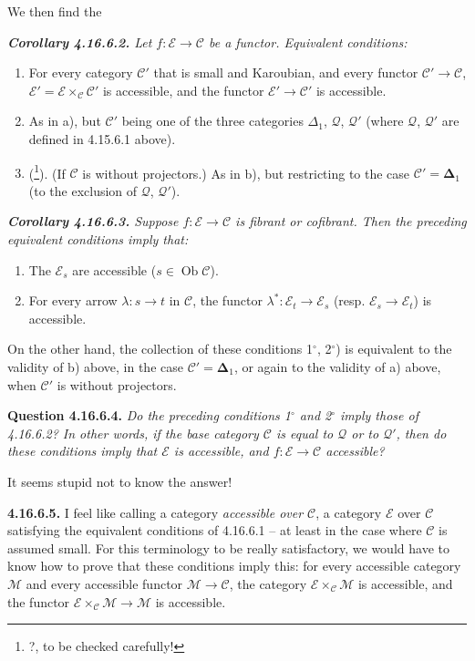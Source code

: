 \documentclass[11pt]{article}
\newcommand{\printedpage}[1]{\marginpar{\footnotesize p.~#1}}
\newcommand{\msp}[1]{\marginpar{\footnotesize [#1]}}
\newcommand{\Ob}{\operatorname{Ob}}
\newcommand{\cM}{\mathcal{M}}
\newcommand{\cE}{\mathcal{E}}
\newcommand{\cC}{\mathcal{C}}
\newcommand{\cQ}{\mathcal{Q}}
\begin{document}
\setcounter{footnote}{195}

\printedpage{184}

\msp{page 475}
We then find the

\begingroup\itshape
\noindent\textbf{\upshape Corollary 4.16.6.2.} Let $f : \cE \longrightarrow \cC$ be a functor. Equivalent conditions:
\begin{enumerate}[label={}]
\item[a)] For every category $\cC'$ that is \textup{small} and \textup{Karoubian}, and every functor $\cC' \longrightarrow \cC$, $\cE' = \cE \times_{\cC} \cC'$ is accessible, and the functor $\cE' \longrightarrow \cC'$ is accessible.
\item[b)] As in a), but $\cC'$ being one of the three categories $\Delta_1$, $\cQ$, $\cQ'$ (where $\cQ$, $\cQ'$ are defined in 4.15.6.1 above).
\item[b$'$)] \textup{(}\footnote{?, to be checked carefully!}\textup{)}. (If $\cC$ is without projectors.) As in b), but restricting to the case $\cC' = \boldsymbol{\Delta}_1$ (to the exclusion of $\cQ$, $\cQ'$).
\end{enumerate}
\endgroup

\begingroup\itshape
\noindent\textbf{\upshape Corollary 4.16.6.3.} Suppose $f : \cE \longrightarrow \cC$ is fibrant or cofibrant. Then the preceding equivalent conditions imply that:
\begin{enumerate}[label={}]
\item[1$^\circ$)] The $\cE_s$ are accessible ($s \in \Ob \cC$).
\item[2$^\circ$)] For every arrow $\lambda : s \longrightarrow t$ in $\cC$, the functor $\lambda^* : \cE_t \longrightarrow \cE_s$ (resp. $\cE_s \longrightarrow \cE_t$) is accessible.
\end{enumerate}
\noindent On the other hand, the collection of these conditions 1$^\circ$, 2$^\circ$) is equivalent to the validity of b) above, in the case $\cC' = \boldsymbol{\Delta}_1$, or again to the validity
\msp{page 476}
of a) above, when $\cC'$ is \textup{without projectors}.
\endgroup

\textbf{Question 4.16.6.4.} \textit{Do the preceding conditions 1$^\circ$ and 2$^\circ$ imply those of 4.16.6.2? In other words, if the base category $\cC$ is equal to $\cQ$ or to $\cQ'$, then do these conditions imply that $\cE$ is accessible, and $f : \cE \longrightarrow \cC$ accessible?}

It seems stupid not to know the answer!

\textbf{4.16.6.5.} I feel like calling a category \textit{accessible over $\cC$}, a category $\cE$ over $\cC$ satisfying the equivalent conditions of 4.16.6.1 -- at least in the case where $\cC$ is assumed small. For this terminology to be really satisfactory, we would have to know how to prove that these conditions imply this: for every accessible category $\cM$ and every accessible functor $\cM \longrightarrow \cC$, the category $\cE \times_{\cC} \cM$ is accessible, and the functor $\cE \times_{\cC} \cM \longrightarrow \cM$ is accessible. %
\end{document}
